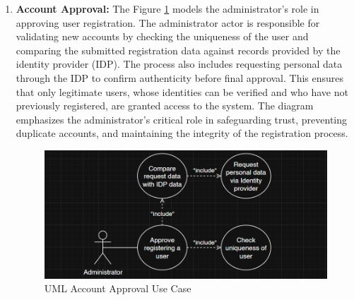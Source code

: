 \begin{enumerate}
    \item \textbf{Account Approval:} The Figure \ref{uml-use-approve} models the administrator’s role in approving user registration. The administrator actor is responsible for validating new accounts by checking the uniqueness of the user and comparing the submitted registration data against records provided by the identity provider (IDP). The process also includes requesting personal data through the IDP to confirm authenticity before final approval. This ensures that only legitimate users, whose identities can be verified and who have not previously registered, are granted access to the system. The diagram emphasizes the administrator’s critical role in safeguarding trust, preventing duplicate accounts, and maintaining the integrity of the registration process.
    \begin{figure}[H]
        \centering
        \includegraphics[width=18cm]{"images/umlDiagrams/uml-use-approve.png"}
        \caption{UML Account Approval Use Case}
        \label{uml-use-approve}
    \end{figure}
\end{enumerate}

